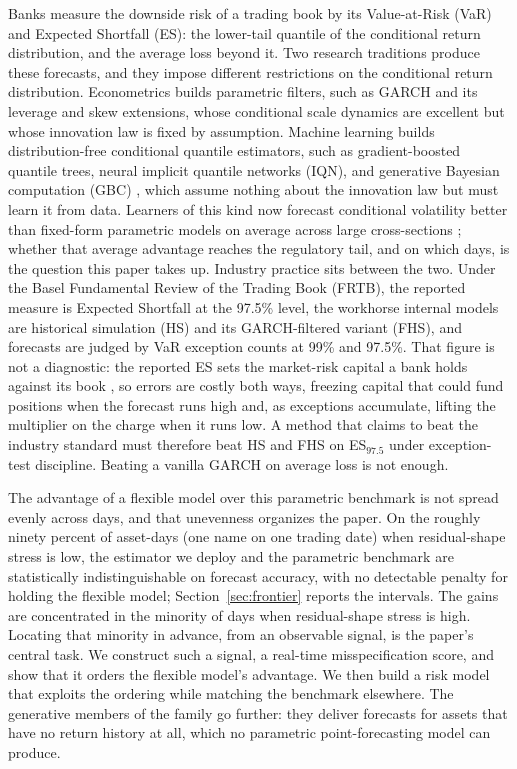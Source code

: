 \documentclass[11pt]{article}
\theoremstyle{remark}
\begin{document}
Banks measure the downside risk of a trading book by its Value-at-Risk
(VaR) and Expected Shortfall (ES): the lower-tail quantile of the
conditional return distribution, and the average loss beyond it. Two
research traditions produce these forecasts, and they impose different
restrictions on the conditional return distribution. Econometrics builds parametric filters, such as GARCH and
its leverage and skew extensions, whose conditional scale dynamics are
excellent but whose innovation law is fixed by assumption. Machine
learning builds distribution-free conditional quantile estimators, such
as gradient-boosted quantile trees, neural implicit quantile networks
(IQN), and generative Bayesian computation (GBC) \citep{polson2023gbc},
which assume nothing about the innovation law but must learn it from
data. Learners of this kind now forecast conditional volatility better than
fixed-form parametric models on average across large cross-sections
\citep{zhang2024commonality}; whether that average advantage reaches the
regulatory tail, and on which days, is the question this paper takes up.
Industry practice sits between the two. Under the Basel Fundamental
Review of the Trading Book (FRTB), the reported measure is Expected
Shortfall at the 97.5\% level, the workhorse internal models are
historical simulation (HS) and its GARCH-filtered variant (FHS), and
forecasts are judged by VaR exception counts at 99\% and 97.5\%. That
figure is not a diagnostic: the reported ES sets the market-risk capital a
bank holds against its book \citep{bcbs2019frtb}, so errors are costly both
ways, freezing capital that could fund positions when the forecast runs high
and, as exceptions accumulate, lifting the multiplier on the charge when it
runs low. A method
that claims to beat the industry standard must therefore beat HS and FHS
on ES$_{97.5}$ under exception-test discipline. Beating a vanilla GARCH
on average loss is not enough.

The advantage of a flexible model over this parametric benchmark is not
spread evenly across days, and that unevenness organizes the paper. On
the roughly ninety percent of asset-days (one name on one trading date)
when residual-shape stress is low, the estimator we deploy and the parametric benchmark are
statistically indistinguishable on forecast accuracy, with no detectable
penalty for holding the flexible model; Section~\ref{sec:frontier}
reports the intervals. The gains are concentrated in the minority of days
when residual-shape stress is high. Locating that minority in advance,
from an observable signal, is the paper's central task. We construct such
a signal, a real-time misspecification score, and show that it orders the
flexible model's advantage. We then build a risk model that exploits the
ordering while matching the benchmark elsewhere. The generative members
of the family go further: they deliver forecasts for assets that have no
return history at all, which no parametric point-forecasting model can
produce.
\end{document}
